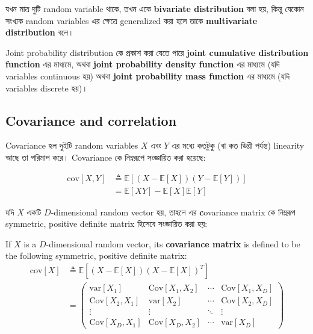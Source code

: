 \documentclass[graybox, envcountchap, twocolumn]{styles/svmult}
\begin{document}
{\bengalifont যখন মাত্র দুটি random variable থাকে, তখন একে \textbf{bivariate distribution} বলা হয়, কিন্তু যেকোন সংখ্যক random variables এর ক্ষেত্রে generalized করা হলে তাকে  \textbf{multivariate distribution} বলে।}

{\bengalifont Joint probability distribution কে প্রকাশ করা যেতে পারে \textbf{joint cumulative distribution function} এর মাধ্যমে, অথবা \textbf{joint probability density function} এর মাধ্যমে (যদি variables continuous হয়) অথবা \textbf{joint probability mass function} এর মাধ্যমে (যদি variables discrete হয়)।}




\subsection{Covariance and correlation}
\begin{definition}

{\bengalifont Covariance} হল দুইটি random variables $X$ এবং $Y$ এর মধ্যে কতটুকু (বা কত ডিগ্রী পর্যন্ত) linearity আছে তা পরিমাপ করে। Covariance কে নিম্নরূপে সংজ্ঞায়িত করা হয়েছে:

\begin{equation}
\begin{split}
\mathrm{cov}[X,Y] & \triangleq \mathbb{E}\left[(X-\mathbb{E}[X])(Y-\mathbb{E}[Y])\right] \\
         & =\mathbb{E}[XY]-\mathbb{E}[X]\mathbb{E}[Y]
\end{split}
\end{equation}
\end{definition}

\begin{definition}
{\bengalifont যদি $X$ একটি $D$-dimensional random vector হয়, তাহলে এর {\textbf covariance matrix} কে নিম্নরূপ symmetric, positive definite matrix হিসেবে সংজ্ঞায়িত করা হয়:}

If $X$ is a $D$-dimensional random vector, its \textbf{covariance matrix} is defined to be the following symmetric, positive definite matrix:
\begin{align}
\mathrm{cov}[X] & \triangleq \mathbb{E}\left[(X-\mathbb{E}[X])(X-\mathbb{E}[X])^T\right] \\
       &  = \left( \begin{array}{cccc}
           \text{var}[X_1] & \text{Cov}[X_1,X_2] & \cdots & \text{Cov}[X_1,X_D] \\
           \text{Cov}[X_2,X_1] & \text{var}[X_2] & \cdots & \text{Cov}[X_2,X_D] \\
		   \vdots & \vdots & \ddots & \vdots \\
           \text{Cov}[X_D,X_1] & \text{Cov}[X_D,X_2] & \cdots & \text{var}[X_D] \end{array} \right)
\end{align}
\end{definition}
\end{document}
